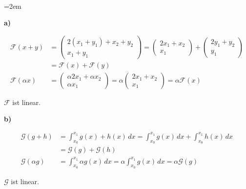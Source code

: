 \begin{solution}    

    \vspace{1\baselineskip}

    \leftskip=2em

    \textbf{a)} 

    \begin{equation*}
        \begin{aligned}
            \mathcal{F}(x+y) &= \begin{pmatrix}
                2(x_1+y_1)+x_2+y_2 \\
                x_1+y_1
            \end{pmatrix} = \begin{pmatrix}
                2x_1+x_2 \\
                x_1
            \end{pmatrix} + \begin{pmatrix}
                2y_1+y_2 \\
                y_1
            \end{pmatrix} \\
            &= \mathcal{F}(x) + \mathcal{F}(y) \\[0.5em]
            \mathcal{F}(\alpha x) &= \begin{pmatrix}
                \alpha 2 x_1+\alpha x_2 \\
                \alpha x_1
            \end{pmatrix} = \alpha \begin{pmatrix}
                2x_1+x_2 \\
                x_1
            \end{pmatrix} = \alpha \mathcal{F}(x)
        \end{aligned}
    \end{equation*}

    \( \mathcal{F} \) ist linear.

    \vspace{1\baselineskip}

    \textbf{b)}

    \begin{equation*}
        \begin{aligned}
            \mathcal{G}(g+h) &= \int_{x_0}^{x_1} g(x)+h(x) \,dx = \int_{x_0}^{x_1} g(x) \,dx + \int_{x_0}^{x_1} h(x) \,dx \\
            &= \mathcal{G}(g) + \mathcal{G}(h) \\[0.5em]
            \mathcal{G}(\alpha g) &= \int_{x_0}^{x_1} \alpha g(x) \,dx = \alpha \int_{x_0}^{x_1} g(x) \,dx = \alpha \mathcal{G}(g)
        \end{aligned}
    \end{equation*}

    \( \mathcal{G} \) ist linear.

\end{solution}

